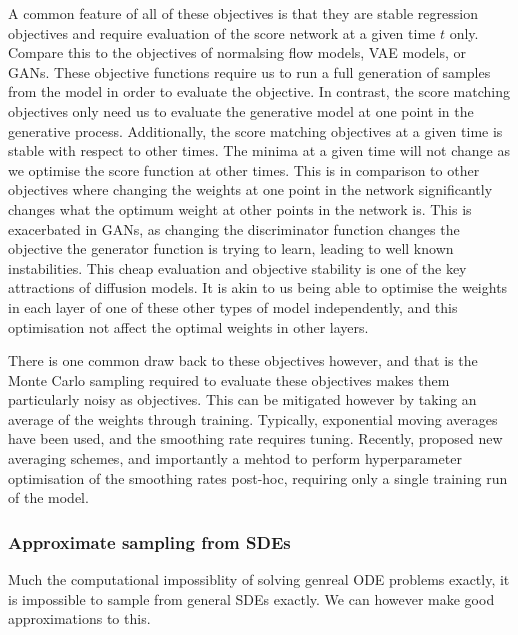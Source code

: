 A common feature of all of these objectives is that they are
\1 stable regression objectives and
\2 require evaluation of the score network at a given time \(t\) only.
\0
Compare this to the objectives of normalsing flow models, VAE models, or GANs.
These objective functions require us to run a full generation of samples from the model in order to evaluate the objective.
In contrast, the score matching objectives only need us to evaluate the generative model at one point in the generative process.
Additionally, the score matching objectives at a given time is stable with respect to other times.
The minima at a given time will not change as we optimise the score function at other times.
This is in comparison to other objectives where changing the weights at one point in the network significantly changes what the optimum weight at other points in the network is.
This is exacerbated in GANs, as changing the discriminator function changes the objective the generator function is trying to learn, leading to well known instabilities.
This cheap evaluation and objective stability is one of the key attractions of diffusion models.
It is akin to us being able to optimise the weights in each layer of one of these other types of model independently, and this optimisation not affect the optimal weights in other layers.

There is one common draw back to these objectives however, and that is the Monte Carlo sampling required to evaluate these objectives makes them particularly noisy as objectives.
This can be mitigated however by taking an average of the weights through training.
Typically, exponential moving averages have been used, and the smoothing rate requires tuning.
Recently, \textcite{karras2023analyzing} proposed new averaging schemes, and importantly a mehtod to perform hyperparameter optimisation of the smoothing rates post-hoc, requiring only a single training run of the model.

\subsubsection{Approximate sampling from SDEs}
\label{sec:sde_discretisation}

Much the computational impossiblity of solving genreal ODE problems exactly, it is impossible to sample from general SDEs exactly.
We can however make good approximations to this.

